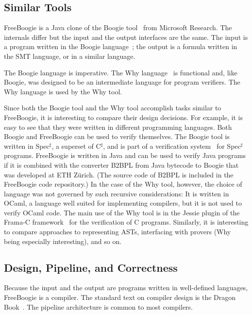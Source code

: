 \documentclass[a4paper]{article}
\newcommand{\csharp}{C$^\sharp$\xspace}
\newcommand{\specsharp}{Spec$^\sharp$\xspace}
\theoremstyle{slanted}
\theoremstyle{definition}
\theoremstyle{remark}
\begin{document}
\subsection{Similar Tools}

FreeBoogie is a Java clone of the Boogie
tool~\cite{barnett2005boogie} from Microsoft Research. The
internals differ but the input and the output interfaces
are the same. The input is a program written in the Boogie
language~\cite{leino2008boogie,leino2010boogie}; the output is a
formula written in the SMT language, or in a similar language.

The Boogie language is imperative. The Why
language~\cite{filliatre2007why} is functional and, like
Boogie, was designed to be an intermediate language for program
verifiers. The Why language is used by the Why tool.

Since both the Boogie tool and the Why tool accomplish tasks
similar to FreeBoogie, it is interesting to compare their design
decisions. For example, it is easy to see that they were written
in different programming languages. Both Boogie and FreeBoogie
can be used to verify themselves. The Boogie tool is written in
\specsharp, a superset of \csharp, and is part of a verification
system~\cite{barnett2005spec} for \specsharp programs. FreeBoogie
is written in Java and can be used to verify Java programs if it
is combined with the converter B2BPL from Java bytecode to Boogie
that was developed at ETH Z\"urich. (The source code of B2BPL
is included in the FreeBoogie code repository.) In the case of
the Why tool, however, the choice of language was not governed
by such recursive considerations: It is written in OCaml, a
language well suited for implementing compilers, but it is not
used to verify OCaml code. The main use of the Why tool is in
the Jessie plugin of the Frama-C framework~\cite{framac} for
the verification of C programs. Similarly, it is interesting to
compare approaches to representing ASTs, interfacing with provers
(Why being especially interesting), and so on.

\subsection{Design, Pipeline, and Correctness}

Because the input and the output are programs written in
well-defined languages, FreeBoogie is a compiler. The standard
text on compiler design is the Dragon Book~\cite{aho2007}. The
pipeline architecture is common to most compilers.
\end{document}
